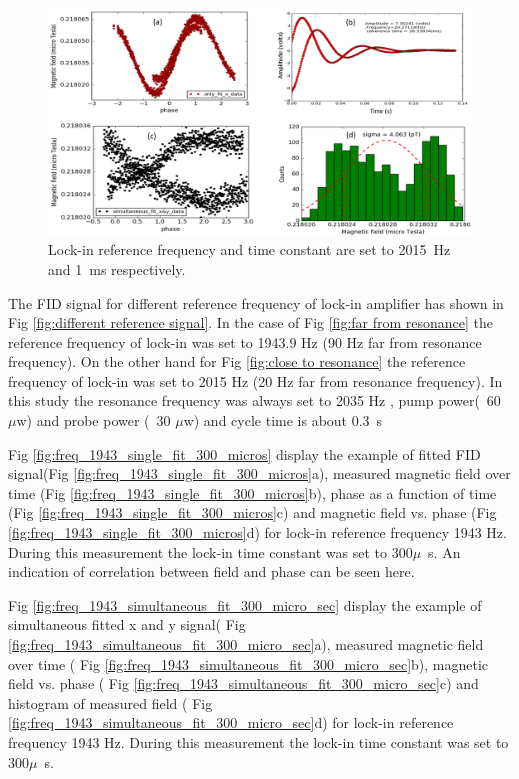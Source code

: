   \begin{figure}[h]
\centering\includegraphics[width=0.8\linewidth]{figures/freq_2015_simultaneous_fit_1ms.png}
\caption{Lock-in reference frequency and time constant are set to 2015~Hz and 1~ms respectively. \label{fig:freq_2015_1ms}}
\end{figure}


 
  The FID signal for different reference frequency of lock-in amplifier has shown in Fig \ref{fig:different reference signal}. In the case of Fig \ref{fig:far from resonance} the reference frequency of lock-in was set to 1943.9 Hz (90 Hz far from resonance frequency). On the other hand for Fig \ref{fig:close to resonance} the reference frequency of lock-in was set to 2015 Hz (20 Hz far from resonance frequency). In this study the resonance frequency was always set to 2035 Hz , pump power(~60 $\mu$w) and probe power (~30 $\mu$w) and cycle time is about 0.3~s
  
  Fig \ref{fig:freq_1943_single_fit_300_micros} display the example of fitted FID signal(Fig \ref{fig:freq_1943_single_fit_300_micros}a), measured magnetic field over time (Fig \ref{fig:freq_1943_single_fit_300_micros}b), phase as a function of time (Fig \ref{fig:freq_1943_single_fit_300_micros}c) and magnetic field vs. phase (Fig \ref{fig:freq_1943_single_fit_300_micros}d) for lock-in reference frequency 1943 Hz. During this measurement the lock-in time constant was set to 300$\mu$~s. An  indication of correlation between field and phase can be seen here.
  
   Fig \ref{fig:freq_1943_simultaneous_fit_300_micro_sec} display the example of simultaneous fitted x and y signal( Fig \ref{fig:freq_1943_simultaneous_fit_300_micro_sec}a), measured magnetic field over time ( Fig \ref{fig:freq_1943_simultaneous_fit_300_micro_sec}b), magnetic field vs. phase ( Fig \ref{fig:freq_1943_simultaneous_fit_300_micro_sec}c) and histogram of measured field ( Fig \ref{fig:freq_1943_simultaneous_fit_300_micro_sec}d) for lock-in reference frequency 1943 Hz. During this measurement the lock-in time constant was set to 300$\mu$~s. 
   
